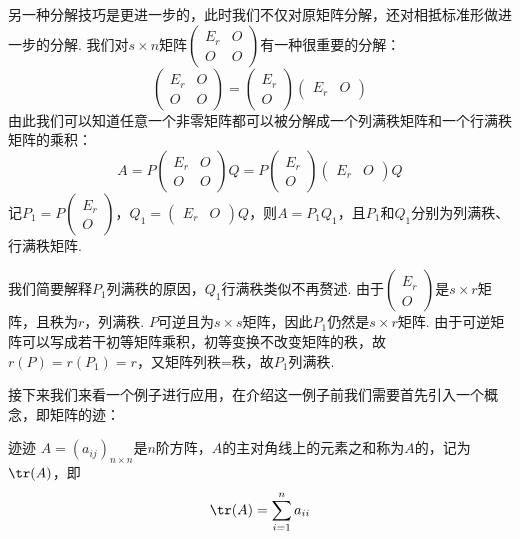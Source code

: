 另一种分解技巧是更进一步的，此时我们不仅对原矩阵分解，还对相抵标准形做进一步的分解. 我们对$s \times n$矩阵$\begin{pmatrix}
        E_r & O \\ O & O
    \end{pmatrix}$有一种很重要的分解：
\[\begin{pmatrix}
        E_r & O \\ O & O
    \end{pmatrix}=\begin{pmatrix}
        E_r \\ O
    \end{pmatrix}\begin{pmatrix}
        E_r & O
    \end{pmatrix}\]
由此我们可以知道任意一个非零矩阵都可以被分解成一个列满秩矩阵和一个行满秩矩阵的乘积：
\[A=P\begin{pmatrix}
        E_r & O \\ O & O
    \end{pmatrix}Q=P\begin{pmatrix}
        E_r \\ O
    \end{pmatrix}\begin{pmatrix}
        E_r & O
    \end{pmatrix}Q\]
记$P_1=P\begin{pmatrix}
        E_r \\ O
    \end{pmatrix}$，$Q_1=\begin{pmatrix}
        E_r & O
    \end{pmatrix}Q$，则$A=P_1Q_1$，且$P_1$和$Q_1$分别为列满秩、行满秩矩阵.

我们简要解释$P_1$列满秩的原因，$Q_1$行满秩类似不再赘述. 由于$\begin{pmatrix}
        E_r \\ O
    \end{pmatrix}$是$s\times r$矩阵，且秩为$r$，列满秩. $P$可逆且为$s\times s$矩阵，因此$P_1$仍然是$s\times r$矩阵. 由于可逆矩阵可以写成若干初等矩阵乘积，初等变换不改变矩阵的秩，故$r(P)=r(P_1)=r$，又矩阵列秩=秩，故$P_1$列满秩.

接下来我们来看一个例子进行应用，在介绍这一例子前我们需要首先引入一个概念，即矩阵的迹：
\begin{definition}{迹}{迹} 
    $A=(a_{ij})_{n\times n}$是$n$阶方阵，$A$的主对角线上的元素之和称为$A$的，记为$\tr(A)$，即
    \[\tr(A)=\sum_{i=1}^n a_{ii}\]
\end{definition}

